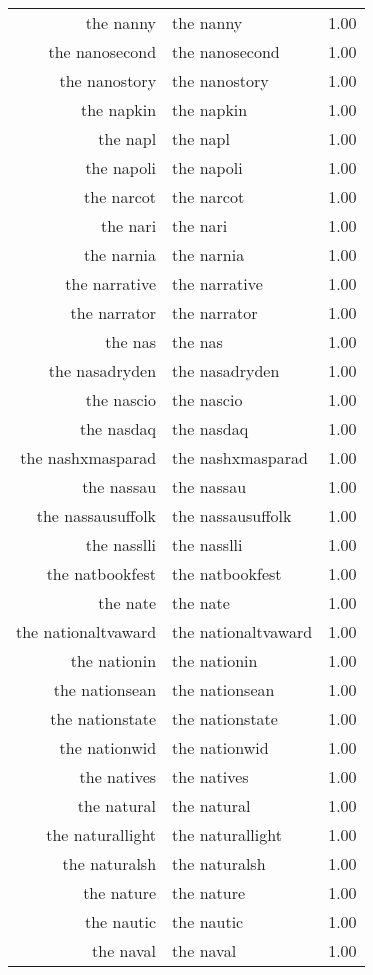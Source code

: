 \begin{table}[ht]
\begin{tabular}{rlr}
  the nanny & the nanny & 1.00 \\ 
  the nanosecond & the nanosecond & 1.00 \\ 
  the nanostory & the nanostory & 1.00 \\ 
  the napkin & the napkin & 1.00 \\ 
  the napl & the napl & 1.00 \\ 
  the napoli & the napoli & 1.00 \\ 
  the narcot & the narcot & 1.00 \\ 
  the nari & the nari & 1.00 \\ 
  the narnia & the narnia & 1.00 \\ 
  the narrative & the narrative & 1.00 \\ 
  the narrator & the narrator & 1.00 \\ 
  the nas & the nas & 1.00 \\ 
  the nasadryden & the nasadryden & 1.00 \\ 
  the nascio & the nascio & 1.00 \\ 
  the nasdaq & the nasdaq & 1.00 \\ 
  the nashxmasparad & the nashxmasparad & 1.00 \\ 
  the nassau & the nassau & 1.00 \\ 
  the nassausuffolk & the nassausuffolk & 1.00 \\ 
  the nasslli & the nasslli & 1.00 \\ 
  the natbookfest & the natbookfest & 1.00 \\ 
  the nate & the nate & 1.00 \\ 
  the nationaltvaward & the nationaltvaward & 1.00 \\ 
  the nationin & the nationin & 1.00 \\ 
  the nationsean & the nationsean & 1.00 \\ 
  the nationstate & the nationstate & 1.00 \\ 
  the nationwid & the nationwid & 1.00 \\ 
  the natives & the natives & 1.00 \\ 
  the natural & the natural & 1.00 \\ 
  the naturallight & the naturallight & 1.00 \\ 
  the naturalsh & the naturalsh & 1.00 \\ 
  the nature & the nature & 1.00 \\ 
  the nautic & the nautic & 1.00 \\ 
  the naval & the naval & 1.00 \\ 

\end{tabular}
\end{table}

